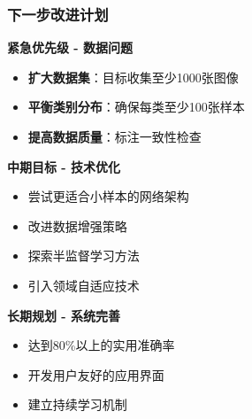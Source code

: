 \documentclass[10pt]{beamer}
\begin{document}
\begin{frame}
\frametitle{下一步改进计划}
\begin{block}{\textbf{紧急优先级 - 数据问题}}
\begin{itemize}
    \item \textbf{扩大数据集}：目标收集至少1000张图像
    \item \textbf{平衡类别分布}：确保每类至少100张样本
    \item \textbf{提高数据质量}：标注一致性检查
\end{itemize}
\end{block}

\begin{block}{\textbf{中期目标 - 技术优化}}
\begin{itemize}
    \item 尝试更适合小样本的网络架构
    \item 改进数据增强策略
    \item 探索半监督学习方法
    \item 引入领域自适应技术
\end{itemize}
\end{block}

\begin{block}{\textbf{长期规划 - 系统完善}}
\begin{itemize}
    \item 达到80\%以上的实用准确率
    \item 开发用户友好的应用界面
    \item 建立持续学习机制
\end{itemize}
\end{block}
\end{frame}
\end{document}
